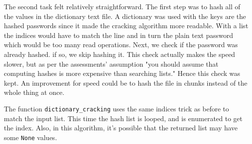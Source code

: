 The second task felt relatively straightforward. The first step was to hash all of the values in the dictionary text file. A dictionary was used with the keys are the hashed passwords since it made the cracking algorithm more readable. With a list the indices would have to match the line and in turn the plain text password which would be too many read operations. Next, we check if the password was already hashed. if so, we skip hashing it. This check actually makes the speed slower, but as per the assessments' assumption "you should assume that computing hashes is more expensive than searching lists." Hence this check was kept. An improvement for speed could be to hash the file in chunks instead of the whole thing at once.

The function \verb|dictionary_cracking| uses the same indices trick as before to match the input list. This time the hash list is looped, and is enumerated to get the index. Also, in this algorithm, it's possible that the returned list may have some \verb|None| values.
